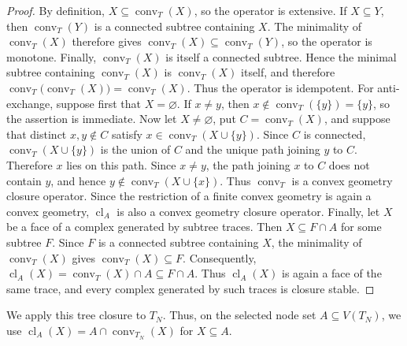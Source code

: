\documentclass[11pt]{amsart}
\newtheorem{proposition}[theorem]{Proposition}
\theoremstyle{definition}
\newcommand{\cl}{\operatorname{cl}}
\newcommand{\conv}{\operatorname{conv}}
\begin{document}
\begin{proof}
By definition, $X\subseteq\conv_T(X)$, so the operator is extensive. If $X\subseteq Y$, then $\conv_T(Y)$ is a connected subtree containing $X$. The minimality of $\conv_T(X)$ therefore gives $\conv_T(X)\subseteq\conv_T(Y)$, so the operator is monotone. Finally, $\conv_T(X)$ is itself a connected subtree. Hence the minimal subtree containing $\conv_T(X)$ is $\conv_T(X)$ itself, and therefore $\conv_T\bigl(\conv_T(X)\bigr)=\conv_T(X)$. Thus the operator is idempotent. For anti-exchange, suppose first that $X=\varnothing$. If $x\ne y$, then $x\notin\conv_T(\{y\})=\{y\}$, so the assertion is immediate. Now let $X\ne\varnothing$, put $C=\conv_T(X)$, and suppose that distinct $x,y\notin C$ satisfy $x\in\conv_T(X\cup\{y\})$. Since $C$ is connected, $\conv_T(X\cup\{y\})$ is the union of $C$ and the unique path joining $y$ to $C$. Therefore $x$ lies on this path. Since $x\ne y$, the path joining $x$ to $C$ does not contain $y$, and hence $y\notin\conv_T(X\cup\{x\})$. Thus $\conv_T$ is a convex geometry closure operator. Since the restriction of a finite convex geometry is again a convex geometry, $\cl_A$ is also a convex geometry closure operator. Finally, let $X$ be a face of a complex generated by subtree traces. Then $X\subseteq F\cap A$ for some subtree $F$. Since $F$ is a connected subtree containing $X$, the minimality of $\conv_T(X)$ gives $\conv_T(X)\subseteq F$. Consequently, $\cl_A(X)=\conv_T(X)\cap A\subseteq F\cap A$. Thus $\cl_A(X)$ is again a face of the same trace, and every complex generated by such traces is closure stable.
\end{proof}

We apply this tree closure to $T_N$. Thus, on the selected node set $A\subseteq V(T_N)$, we use $\cl_A(X)=A\cap\conv_{T_N}(X)$ for $X\subseteq A$.

\end{document}
